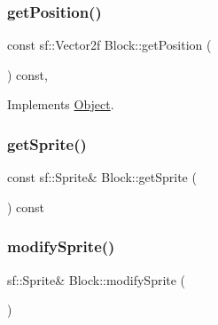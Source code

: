 \mbox{\label{class_block_ae7621aaed284804fc898174207eb1587}} 
\subsubsection{\texorpdfstring{getPosition()}{getPosition()}}
{\footnotesize\ttfamily const sf\+::\+Vector2f Block\+::get\+Position (\begin{DoxyParamCaption}{ }\end{DoxyParamCaption}) const\hspace{0.3cm}{\ttfamily [inline]}, {\ttfamily [virtual]}}



Implements \mbox{\hyperlink{class_object_a3fd6370b8cfc53e5e41d09704726c2d4}{Object}}.

\mbox{\label{class_block_a40e27a756a586c9784d4023163bf92ef}} 
\subsubsection{\texorpdfstring{getSprite()}{getSprite()}}
{\footnotesize\ttfamily const sf\+::\+Sprite\& Block\+::get\+Sprite (\begin{DoxyParamCaption}{ }\end{DoxyParamCaption}) const\hspace{0.3cm}{\ttfamily [inline]}}

\mbox{\label{class_block_affece2c491813eba0583a9deeee9d925}} 
\subsubsection{\texorpdfstring{modifySprite()}{modifySprite()}}
{\footnotesize\ttfamily sf\+::\+Sprite\& Block\+::modify\+Sprite (\begin{DoxyParamCaption}{ }\end{DoxyParamCaption})\hspace{0.3cm}{\ttfamily [inline]}}

\mbox{\label{class_block_a50da8f492c009ad7f4e9e30d904603ef}} 

